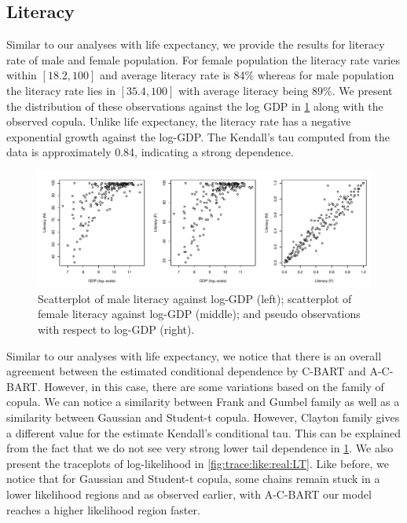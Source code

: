 \documentclass{amsart}
\begin{document}
\subsection{Literacy}
Similar to our analyses with life expectancy, we provide the results for literacy rate of male and female population. For female population the literacy rate varies within $[18.2,100]$ and average literacy rate is 84\% whereas for male population the literacy rate lies in $[35.4,100]$ with average literacy being 89\%. We present the distribution of these observations against the log GDP in \cref{fig:data:dist:LT} along with the observed copula. Unlike life expectancy, the literacy rate has a negative exponential growth against the log-GDP. The Kendall's tau computed from the data is approximately 0.84, indicating a strong dependence. 
\begin{figure}
	\centering
	\includegraphics[width = 0.95\linewidth]{"cia_LT_plots.pdf"}
	\caption{Scatterplot of male literacy against log-GDP (left); scatterplot of female literacy against log-GDP (middle); and pseudo observations with respect to log-GDP (right).}
	\label{fig:data:dist:LT}
\end{figure}

Similar to our analyses with life expectancy, we notice that there is an overall agreement between the estimated conditional dependence by C-BART and A-C-BART. However, in this case, there are some variations based on the family of copula. We can notice a similarity between Frank and Gumbel family as well as a similarity between Gaussian and Student-t copula. However, Clayton family gives a different value for the estimate Kendall's conditional tau. This can be explained from the fact that we do not see very strong lower tail dependence in \cref{fig:data:dist:LT}. We also present the traceplots of log-likelihood in \cref{fig:trace:like:real:LT}. Like before, we notice that for Gaussian and Student-t copula, some chains remain stuck in a lower likelihood regions and as observed earlier, with A-C-BART our model reaches a higher likelihood region faster.
\end{document}
